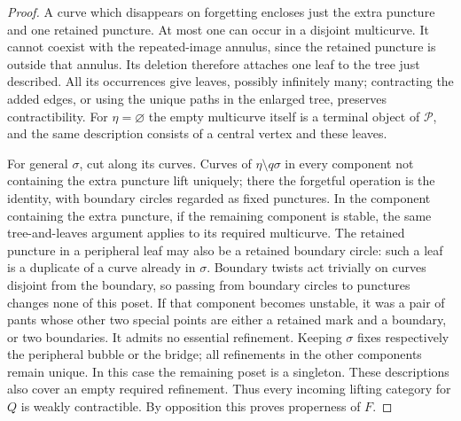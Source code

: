 \begin{proof}
A curve which disappears on forgetting encloses just the extra puncture and one retained puncture. At most one can occur in a disjoint multicurve. It cannot coexist with the repeated-image annulus, since the retained puncture is outside that annulus. Its deletion therefore attaches one leaf to the tree just described. All its occurrences give leaves, possibly infinitely many; contracting the added edges, or using the unique paths in the enlarged tree, preserves contractibility. For $\eta=\varnothing$ the empty multicurve itself is a terminal object of $\mathcal P$, and the same description consists of a central vertex and these leaves.

For general $\sigma$, cut along its curves. Curves of $\eta\setminus q\sigma$ in every component not containing the extra puncture lift uniquely; there the forgetful operation is the identity, with boundary circles regarded as fixed punctures. In the component containing the extra puncture, if the remaining component is stable, the same tree-and-leaves argument applies to its required multicurve. The retained puncture in a peripheral leaf may also be a retained boundary circle: such a leaf is a duplicate of a curve already in $\sigma$. Boundary twists act trivially on curves disjoint from the boundary, so passing from boundary circles to punctures changes none of this poset. If that component becomes unstable, it was a pair of pants whose other two special points are either a retained mark and a boundary, or two boundaries. It admits no essential refinement. Keeping $\sigma$ fixes respectively the peripheral bubble or the bridge; all refinements in the other components remain unique. In this case the remaining poset is a singleton. These descriptions also cover an empty required refinement. Thus every incoming lifting category for $Q$ is weakly contractible. By opposition this proves properness of $F$.


\end{proof}
